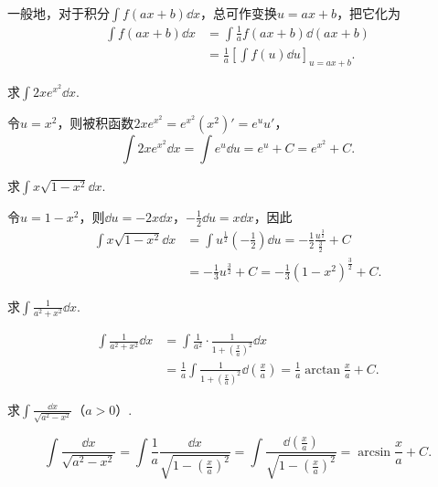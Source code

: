 一般地，对于积分\(\int f(ax+b) \dd{x}\)，总可作变换\(u=ax+b\)，把它化为\begin{align*}
\int f(ax+b) \dd{x}
&= \int \frac{1}{a} f(ax+b) \dd(ax+b) \\
&= \frac{1}{a} \left[ \int f(u) \dd{u} \right]_{u=ax+b}.
\end{align*}

\begin{example}
求\(\int 2x e^{x^2} \dd{x}\).
\begin{solution}
令\(u=x^2\)，则被积函数\(2x e^{x^2} = e^{x^2} (x^2)' = e^u u'\)，\[
\int 2x e^{x^2} \dd{x}
= \int e^u \dd{u}
= e^u + C
= e^{x^2} + C.
\]
\end{solution}
\end{example}

\begin{example}
求\(\int x \sqrt{1-x^2} \dd{x}\).
\begin{solution}
令\(u=1-x^2\)，则\(\dd{u} = -2x\dd{x}\)，\(-\frac{1}{2}\dd{u} = x\dd{x}\)，因此\begin{align*}
\int x \sqrt{1-x^2} \dd{x}
&= \int u^{\frac{1}{2}} \left(-\frac{1}{2}\right) \dd{u}
= -\frac{1}{2} \frac{u^{\frac{3}{2}}}{\frac{3}{2}} + C \\
&= -\frac{1}{3} u^{\frac{3}{2}} + C
= -\frac{1}{3} (1-x^2)^{\frac{3}{2}} + C.
\end{align*}
\end{solution}
\end{example}

\begin{example}
求\(\int \frac{1}{a^2+x^2} \dd{x}\).
\begin{solution}
\begin{align*}
\int \frac{1}{a^2+x^2} \dd{x}
&= \int \frac{1}{a^2} \cdot \frac{1}{1+\left(\frac{x}{a}\right)^2} \dd{x} \\
&= \frac{1}{a} \int \frac{1}{1+\left(\frac{x}{a}\right)^2} \dd(\frac{x}{a})
= \frac{1}{a} \arctan\frac{x}{a} + C.
\end{align*}
\end{solution}
\end{example}

\begin{example}
求\(\int \frac{\dd{x}}{\sqrt{a^2-x^2}}\)（\(a>0\)）.
\begin{solution}
\[
\int \frac{\dd{x}}{\sqrt{a^2-x^2}}
= \int \frac{1}{a} \frac{\dd{x}}{\sqrt{1-\left(\frac{x}{a}\right)^2}}
= \int \frac{\dd(\frac{x}{a})}{\sqrt{1-\left(\frac{x}{a}\right)^2}}
= \arcsin\frac{x}{a} + C.
\]
\end{solution}
\end{example}

